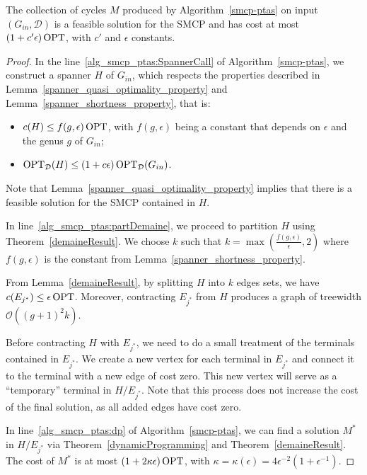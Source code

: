 \begin{ftheo}
    The collection of cycles \(M\) produced by Algorithm~\ref{smcp-ptas} on input $(G_{in}, \mathcal{D})$ is a feasible solution for the SMCP and has cost at most \((1 + c' \epsilon) \operatorname{\textrm{OPT}}\), with \(c'\) and \(\epsilon\) constants.
\end{ftheo}
\begin{proof}

    In the line~\ref{alg_smcp_ptas:SpannerCall} of Algorithm~\ref{smcp-ptas}, we construct a spanner \(H\) of \(G_{in}\), which respects the properties described in Lemma~\ref{spanner_quasi_optimality_property} and Lemma~\ref{spanner_shortness_property}, that is:

    \begin{itemize}
        \item \(c(H) \leq f(g, \epsilon) \operatorname{\textrm{OPT}}\), with \(f(g, \epsilon)\) being a constant that depends on \(\epsilon\) and the genus \(g\) of \(G_{in}\);
        \item \(\operatorname{\textrm{OPT}}_{\mathcal{D}}(H) \leq (1 + c \epsilon) \operatorname{\textrm{OPT}}_{\mathcal{D}} (G_{in})\).
    \end{itemize}

    Note that Lemma~\ref{spanner_quasi_optimality_property} implies that there is a feasible solution for the SMCP contained in \(H\).

    In line~\ref{alg_smcp_ptas:partDemaine}, we proceed to partition \(H\) using Theorem~\ref{demaineResult}. We choose \(k\) such that \(k = \max( \frac{f(g, \epsilon)}{\epsilon}, 2)\) where \(f(g, \epsilon)\) is the constant from Lemma~\ref{spanner_shortness_property}. 
    
    From Lemma~\ref{demaineResult}, by splitting \(H\) into \(k\) edges sets, we have \(c(E_{j^\ast}) \leq \epsilon \operatorname{\textrm{OPT}}\). Moreover, contracting \(E_{j^\ast}\) from \(H\) produces a graph of treewidth \(\mathcal{O}((g +1)^2 k)\).

    Before contracting \(H\) with \(E_{j^\ast}\), we need to do a small treatment of the terminals contained in \(E_{j^\ast}\). We create a new vertex for each terminal in \(E_{j^\ast}\) and connect it to the terminal with a new edge of cost zero. This new vertex will serve as a ``temporary'' terminal in \(H / E_{j^\ast}\). Note that this process does not increase the cost of the final solution, as all added edges have cost zero.

    In line~\ref{alg_smcp_ptas:dp} of Algorithm~\ref{smcp-ptas}, we can find a solution \(M^\ast\) in \(H / E_{j^\ast}\) via Theorem~\ref{dynamicProgramming} and Theorem~\ref{demaineResult}. The cost of \(M^\ast\) is at most \((1 + 2 \kappa \epsilon) \operatorname{\textrm{OPT}}\), with \(\kappa = \kappa(\epsilon) = 4 \epsilon ^ {-2} (1 + \epsilon ^ {-1})\).


\end{proof}
